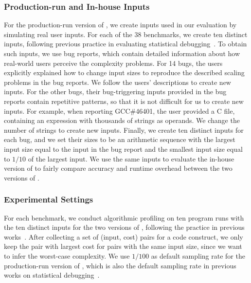\subsubsection{Production-run and In-house Inputs}

For the production-run version of \Tool, we create inputs used in our evaluation
by simulating real user inputs.
For each of the 38 benchmarks, we create ten distinct inputs, 
following previous practice in evaluating statistical debugging~\cite{joy.asplos13,SongOOPSLA2014}.
To obtain such inputs, we use bug reports, 
which contain detailed information about how real-world 
users perceive the complexity problems. 
For 14 bugs, 
the users explicitly explained how to change input sizes 
to reproduce the described scaling problems in the bug reports. 
We follow the users' descriptions to create new inputs. 
For the other bugs, their bug-triggering inputs provided 
in the bug reports contain repetitive patterns, 
so that it is not difficult for us to create new inputs.
For example, when reporting GCC\#46401,
the user provided a C file, 
containing an expression with thousands of strings as operands. 
We change the number of strings to create new inputs. 
Finally, we create ten distinct inputs for each bug, 
and we set their sizes 
to be an arithmetic sequence with the largest input size
equal to the input in the bug report and the 
smallest input size equal to $1/10$ 
of the largest input.
We use the same inputs to evaluate the in-house version of \Tool
to fairly compare accuracy and runtime 
overhead between the two versions of \Tool.



\subsubsection{Experimental Settings}

For each benchmark, we conduct algorithmic profiling on ten 
program runs with the ten distinct inputs for the two
versions of \Tool, following the practice in 
previous works~\cite{joy.asplos13,SongOOPSLA2014}.
After collecting a set of (input, cost) pairs for a code construct,
we only keep the pair with largest cost for pairs with the same input size,
since we want to infer the worst-case complexity.
We use $1/100$ as default sampling rate for 
the production-run version of \Tool, 
which is also the default sampling rate 
in previous works on statistical debugging~\cite{liblit03,CCI,ldoctor}.

